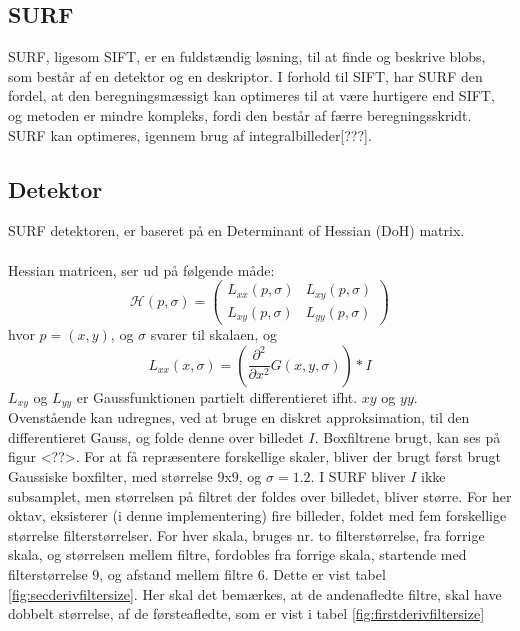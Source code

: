 
\subsection{SURF}
SURF, ligesom SIFT, er en fuldstændig løsning, til at finde og beskrive blobs, som består af en detektor og en deskriptor. I forhold til SIFT, har SURF den fordel, at den beregningsmæssigt kan optimeres til at være hurtigere end SIFT, og metoden er mindre kompleks, fordi den består af færre beregningsskridt. SURF kan optimeres, igennem brug af integralbilleder[???].
\subsection*{Detektor}
SURF detektoren, er baseret på en Determinant of Hessian (DoH) matrix.
\\
\\
Hessian matricen, ser ud på følgende måde:
\begin{equation}
\mathcal{H}(p, \sigma) = 
 \begin{pmatrix}
 	L_{xx}(p, \sigma) & L_{xy}(p, \sigma) \\
 	L_{xy}(p, \sigma) & L_{yy}(p, \sigma) 
 \end{pmatrix}
 \label{hessianmatrix}
\end{equation}
hvor $p = (x,y)$, og $\sigma$ svarer til skalaen, og 
\begin{equation}
L_{xx}(x, \sigma) = (\frac{\partial^2 }{\partial x^2 } G(x,y,\sigma)) * I
\end{equation}
$L_{xy}$ og $L_{yy}$ er Gaussfunktionen partielt differentieret ifht. $xy$ og $yy$.
\\
Ovenstående kan udregnes, ved at bruge en diskret approksimation, til den differentieret Gauss, og folde denne over billedet $I$. Boxfiltrene brugt, kan ses på figur <??>. For at få repræsentere forskellige skaler, bliver der brugt først brugt Gaussiske boxfilter, med størrelse 9x9, og $\sigma = 1.2$. I SURF bliver $I$ ikke subsamplet, men størrelsen på filtret der foldes over billedet, bliver større. For her oktav, eksisterer (i denne implementering) fire billeder, foldet med fem forskellige størrelse filterstørrelser. For hver skala, bruges nr. to filterstørrelse, fra forrige skala, og størrelsen mellem filtre, fordobles fra forrige skala, startende med filterstørrelse 9, og afstand mellem filtre 6. Dette er vist tabel \ref{fig:secderivfiltersize}. Her skal det bemærkes, at de andenafledte filtre, skal have dobbelt størrelse, af de førsteafledte, som er vist i tabel \ref{fig:firstderivfiltersize}



